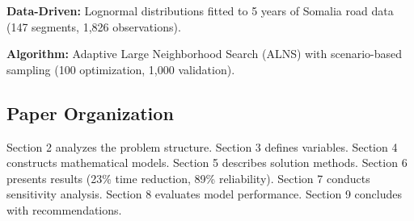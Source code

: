 \noindent \textbf{Data-Driven:} Lognormal distributions fitted to 5 years of Somalia road data (147 segments, 1,826 observations).

\noindent \textbf{Algorithm:} Adaptive Large Neighborhood Search (ALNS) with scenario-based sampling (100 optimization, 1,000 validation).

\subsection{Paper Organization}

Section 2 analyzes the problem structure. Section 3 defines variables. Section 4 constructs mathematical models. Section 5 describes solution methods. Section 6 presents results (23\% time reduction, 89\% reliability). Section 7 conducts sensitivity analysis. Section 8 evaluates model performance. Section 9 concludes with recommendations.

\label{sec:introduction}
